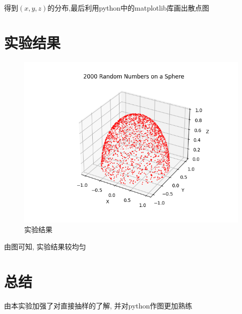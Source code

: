 \documentclass[UTF8]{ctexart}
\begin{document}
得到$(x,y,z)$的分布,最后利用python中的matplotlib库画出散点图

\section{实验结果}
\begin{figure}[H]
    \centering
    \includegraphics[scale=1]{figure.png}
    \caption{实验结果}
\end{figure}
由图可知, 实验结果较均匀

\section{总结}
由本实验加强了对直接抽样的了解, 并对python作图更加熟练
\end{document}

